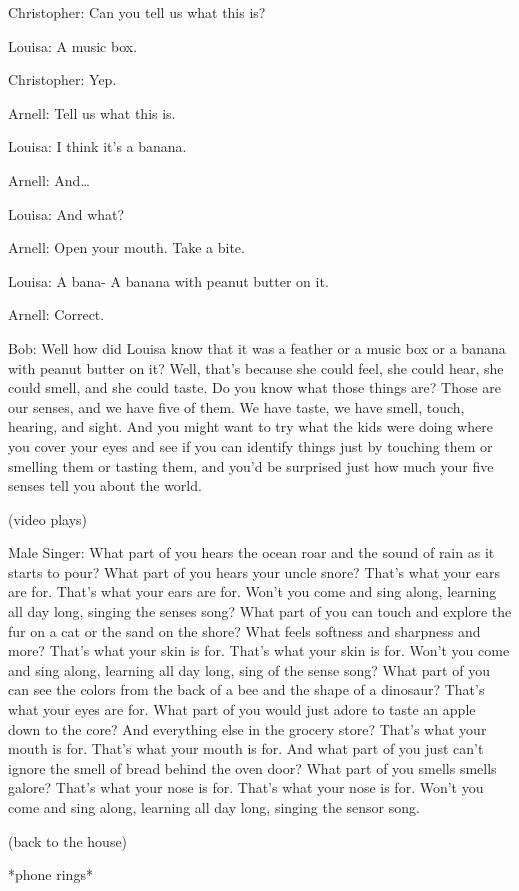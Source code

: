 Christopher: Can you tell us what this is?

Louisa: A music box.

Christopher: Yep.

Arnell: Tell us what this is.

Louisa: I think it's a banana.

Arnell: And\dots

Louisa: And what?

Arnell: Open your mouth. Take a bite.

Louisa: A bana- A banana with peanut butter on it.

Arnell: Correct.

Bob: Well how did Louisa know that it was a feather or a music box or a banana with peanut butter on it? Well, that's because she could feel, she could hear, she could smell, and she could taste. Do you know what those things are? Those are our senses, and we have five of them. We have taste, we have smell, touch, hearing, and sight. And you might want to try what the kids were doing where you cover your eyes and see if you can identify things just by touching them or smelling them or tasting them, and you'd be surprised just how much your five senses tell you about the world.

(video plays)

Male Singer: What part of you hears the ocean roar and the sound of rain as it starts to pour? What part of you hears your uncle snore? That's what your ears are for. That's what your ears are for. Won't you come and sing along, learning all day long, singing the senses song? What part of you can touch and explore the fur on a cat or the sand on the shore? What feels softness and sharpness and more? That's what your skin is for. That's what your skin is for. Won't you come and sing along, learning all day long, sing of the sense song? What part of you can see the colors from the back of a bee and the shape of a dinosaur? That's what your eyes are for. What part of you would just adore to taste an apple down to the core? And everything else in the grocery store? That's what your mouth is for. That's what your mouth is for. And what part of you just can't ignore the smell of bread behind the oven door? What part of you smells smells galore? That's what your nose is for. That's what your nose is for. Won't you come and sing along, learning all day long, singing the sensor song.

(back to the house)

*phone rings*

